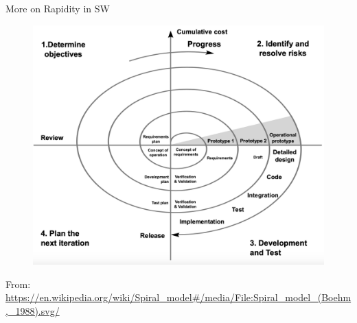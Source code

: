 \documentclass{beamer}
\begin{document}
\begin{frame}
{\centerline{More on Rapidity in SW}}

\begin{figure}[htp]
    \centering
     \includegraphics[width=.65\textwidth]{P2023.AIBCCSS.StoryTelling/Spiral_model.png}
    \label{F:Spiral}
\end{figure}


\begin{center}
    \tiny{From: \url{https://en.wikipedia.org/wiki/Spiral\_model\#/media/File:Spiral\_model\_(Boehm,\_1988).svg/}}
\end{center}

\end{frame}
\end{document}
